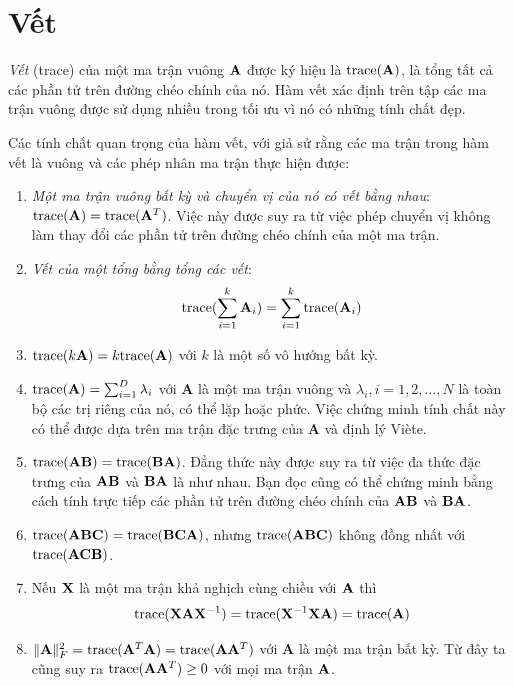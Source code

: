 \section{Vết}
\textit{Vết} (trace) của một ma trận vuông $\mathbf{A}$ được ký hiệu là $\text{trace}(\mathbf{A})$, là tổng
tất cả các phần tử trên đường chéo chính của nó. Hàm vết xác định trên tập các
ma trận vuông được sử dụng nhiều trong tối ưu vì nó có những tính chất đẹp.

Các tính chất quan trọng của hàm vết, với giả sử rằng các ma trận trong hàm
vết là vuông và các phép nhân ma trận thực hiện được:
\begin{enumerate}
\item \textit{Một ma trận vuông bất kỳ và chuyển vị của nó có vết bằng
nhau}: $\text{trace}(\mathbf{A}) = \text{trace}(\mathbf{A}^T)$. Việc này được suy ra từ việc phép
chuyển vị không làm thay đổi các phần tử trên đường chéo chính của một ma
trận.


\item \textit{Vết của một tổng bằng tổng các vết}:
$$\displaystyle\text{trace}(\sum_{i=1}^k \mathbf{A}_i) = \sum_{i=1}^k \text{trace}(\mathbf{A}_i)$$

\item $\text{trace}(k\mathbf{A}) = k\text{trace}(\mathbf{A})$ với $k$ là một
số vô hướng bất kỳ.

\item $\text{trace}(\mathbf{A}) = \sum_{i = 1}^D \lambda_i $ với
$\mathbf{A}$ là một ma trận vuông và $\lambda_i, i = 1, 2, \dots, N$ là toàn
bộ các trị riêng của nó, có thể lặp hoặc phức. Việc chứng minh tính chất này
có thể được dựa trên ma trận đặc trưng của $\mathbf{A}$ và định lý Viète.

\item $\text{trace}(\mathbf{AB}) = \text{trace}(\mathbf{BA})$. Đẳng thức này
được suy ra từ việc đa thức đặc trưng của $\mathbf{A}\mathbf{B}$ và $\mathbf{B}\mathbf{A}$ là như nhau.
Bạn đọc cũng có thể chứng minh bằng cách tính trực tiếp các phần tử trên
đường chéo chính của $\mathbf{A}\mathbf{B}$ và $\mathbf{B}\mathbf{A}$.

\item $\text{trace}(\mathbf{A}\mathbf{B}\mathbf{C}) = \text{trace}(\mathbf{B}\mathbf{C}\mathbf{A})$, nhưng $\text{trace}(\mathbf{A}\mathbf{B}\mathbf{C})$
không đồng nhất với $\text{trace}(\mathbf{A}\mathbf{C}\mathbf{B})$.

\item Nếu $\mathbf{X}$ là một ma trận khả nghịch cùng chiều với $\mathbf{A}$ thì
\begin{equation*}
\text{trace} (\mathbf{X}\mathbf{A}\mathbf{X}^{-1}) = \text{trace}(\mathbf{X}^{-1}\mathbf{X}\mathbf{A}) = \text{trace}(\mathbf{A})
\end{equation*}
\item $\|\mathbf{A}\|_F^2 = \text{trace}(\mathbf{A}^T\mathbf{A}) =
\text{trace}(\mathbf{A}\mathbf{A}^T)$ với $\mathbf{A}$ là một ma trận bất kỳ. Từ
đây ta cũng suy ra $\text{trace}(\mathbf{A}\mathbf{A}^T) \geq 0$ với mọi ma trận $\mathbf{A}$.

\end{enumerate}
